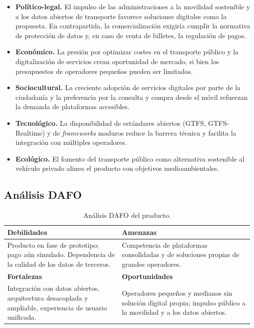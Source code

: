 \begin{itemize}
  \item \textbf{Político-legal.} El impulso de las administraciones a la movilidad sostenible y a los datos abiertos de transporte favorece soluciones digitales como la propuesta. En contrapartida, la comercialización exigiría cumplir la normativa de protección de datos y, en caso de venta de billetes, la regulación de pagos.
  \item \textbf{Económico.} La presión por optimizar costes en el transporte público y la digitalización de servicios crean oportunidad de mercado, si bien los presupuestos de operadores pequeños pueden ser limitados.
  \item \textbf{Sociocultural.} La creciente adopción de servicios digitales por parte de la ciudadanía y la preferencia por la consulta y compra desde el móvil refuerzan la demanda de plataformas accesibles.
  \item \textbf{Tecnológico.} La disponibilidad de estándares abiertos (GTFS, GTFS-Realtime) y de \textit{frameworks} maduros reduce la barrera técnica y facilita la integración con múltiples operadores.
  \item \textbf{Ecológico.} El fomento del transporte público como alternativa sostenible al vehículo privado alinea el producto con objetivos medioambientales.
\end{itemize}

\subsection{Análisis DAFO}

\begin{table}[h!]
\centering
\small
\begin{tabular}{|p{7cm}|p{7cm}|}
\hline
\textbf{Debilidades} & \textbf{Amenazas} \\ \hline
Producto en fase de prototipo; pago aún simulado. Dependencia de la calidad de los datos de terceros. & Competencia de plataformas consolidadas y de soluciones propias de grandes operadores. \\ \hline
\textbf{Fortalezas} & \textbf{Oportunidades} \\ \hline
Integración con datos abiertos, arquitectura desacoplada y ampliable, experiencia de usuario unificada. & Operadores pequeños y medianos sin solución digital propia; impulso público a la movilidad y a los datos abiertos. \\ \hline
\end{tabular}
\caption{Análisis DAFO del producto.}
\label{tab:dafo}
\end{table}


